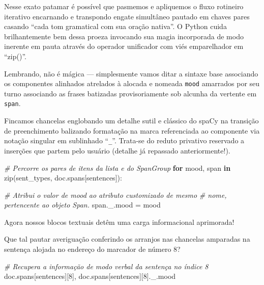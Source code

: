\documentclass[
  brazilian,
]{article}
\newenvironment{Shaded}{}{}
\newcommand{\BuiltInTok}[1]{#1}
\newcommand{\CommentTok}[1]{\textcolor[rgb]{0.38,0.63,0.69}{\textit{#1}}}
\newcommand{\ControlFlowTok}[1]{\textcolor[rgb]{0.00,0.44,0.13}{\textbf{#1}}}
\newcommand{\DecValTok}[1]{\textcolor[rgb]{0.25,0.63,0.44}{#1}}
\newcommand{\KeywordTok}[1]{\textcolor[rgb]{0.00,0.44,0.13}{\textbf{#1}}}
\newcommand{\NormalTok}[1]{#1}
\newcommand{\OperatorTok}[1]{\textcolor[rgb]{0.40,0.40,0.40}{#1}}
\newcommand{\StringTok}[1]{\textcolor[rgb]{0.25,0.44,0.63}{#1}}
\begin{document}
Nesse exato patamar é possível que pasmemos e apliquemos o fluxo
rotineiro iterativo encarnando e transpondo engate simultâneo pautado em
chaves pares casando ``cada tom gramatical com sua oração nativa''. O
Python cuida brilhantemente bem dessa proeza invocando sua magia
incorporada de modo inerente em pauta através do operador unificador com
viés emparelhador em ``zip()''.

Lembrando, não é mágica --- simplesmente vamos ditar a sintaxe base
associando os componentes alinhados atrelados à alocada e nomeada
\texttt{mood} amarrados por seu turno associando as frases batizadas
provisoriamente sob alcunha da vertente em \texttt{span}.

Fincamos chancelas englobando um detalhe sutil e clássico do spaCy na
transição de preenchimento balizando formatação na marca referenciada ao
componente via notação singular em sublinhado ``\texttt{\_}''. Trata-se
do reduto privativo reservado a inserções que partem pelo usuário
(detalhe já repassado anteriormente!).

\begin{Shaded}
\begin{Highlighting}[]
\CommentTok{\# Percorre os pares de itens da lista e do SpanGroup}
\ControlFlowTok{for}\NormalTok{ mood, span }\KeywordTok{in} \BuiltInTok{zip}\NormalTok{(sent\_types, doc.spans[}\StringTok{\textquotesingle{}sentences\textquotesingle{}}\NormalTok{]):}
    
    \CommentTok{\# Atribui o valor de \textquotesingle{}mood\textquotesingle{} ao atributo customizado de mesmo}
    \CommentTok{\# nome, pertencente ao objeto Span.}
\NormalTok{    span.\_.mood }\OperatorTok{=}\NormalTok{ mood}
\end{Highlighting}
\end{Shaded}

Agora nossos blocos textuais detêm uma carga informacional aprimorada!

Que tal pautar averiguação conferindo os arranjos nas chancelas
amparadas na sentença alojada no endereço do marcador de número 8?

\begin{Shaded}
\begin{Highlighting}[]
\CommentTok{\# Recupera a informação de modo verbal da sentença no índice 8}
\NormalTok{doc.spans[}\StringTok{\textquotesingle{}sentences\textquotesingle{}}\NormalTok{][}\DecValTok{8}\NormalTok{], doc.spans[}\StringTok{\textquotesingle{}sentences\textquotesingle{}}\NormalTok{][}\DecValTok{8}\NormalTok{].\_.mood}
\end{Highlighting}
\end{Shaded}
\end{document}
